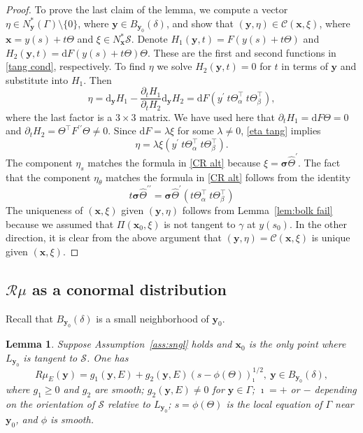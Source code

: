 \documentclass[11pt]{article}
\newcommand{\be}{\begin{equation}}
\newcommand{\ee}{\end{equation}}
\newcommand{\s}{\mathcal S}
\newcommand{\cC}{\mathcal C}
\newcommand{\pa}{\partial}
\newcommand{\bt}{\beta}
\newcommand{\al}{\alpha}
\newcommand{\la}{\lambda}
\newcommand{\dd}{\mathrm{d}}
\newcommand{\ga}{\gamma}
\newcommand{\de}{\delta}
\numberwithin{equation}{section}
\newcommand{\vy}{\mathbf{y}}
\newcommand{\vx}{\mathbf{x}}
\newcommand{\vsig}{{\boldsymbol{\sigma}}}
\newtheorem{lemma}[theorem]{Lemma}
\theoremstyle{definition}
\begin{document}
\begin{proof}
To prove the last claim of the lemma, we compute a vector $\eta\in N_{\vy}^*(\Gamma)\setminus\{0\}$, where $\vy\in B_{\vy_0}(\de)$, and show that $(\vy,\eta)\in\cC(\vx,\xi)$, where $\vx=y(s)+t\Theta$ and $\xi\in N_{\vx}^*\s$. Denote $H_1(\vy,t) = F(y(s)+t\Theta)$ and $H_2(\vy,t) = \dd F(y(s)+t\Theta)\Theta$. These are the first and second functions in \eqref{tang cond}, respectively. To find $\eta$ we solve $H_2(\vy,t)=0$ for $t$ in terms of $\vy$ and substitute into $H_1$. Then
\be\label{eta tang}
\eta=\dd_{\vy}H_1-\frac{\pa_t H_1}{\pa_t H_2}\dd_{\vy} H_2=\dd F(y^\prime\ t\Theta_\al^\top\ t\Theta_\bt^\top),
\ee
where the last factor is a $3\times 3$ matrix. We have used here that $\pa_t H_1=\dd F\Theta=0$
and $\pa_t H_2=\Theta^\top F^{\prime\prime}\Theta\not=0$. Since $\dd F=\la\xi$ for some $\la\neq0$, \eqref{eta tang} implies
\be\label{eta tang v2}
\eta=\la\xi(y^\prime\ t\Theta_\al^\top\ t\Theta_\bt^\top).
\ee
The component $\eta_s$ matches the formula in \eqref{CR alt} because $\xi=\vsig\hat\Theta^\prime$. The fact that the component $\eta_\theta$ matches the formula in \eqref{CR alt} follows from the identity
\be
t\vsig\hat\Theta^{\prime\prime}=\vsig\hat\Theta^\prime(t\Theta_\al^\top\ t\Theta_\bt^\top)
\ee
The uniqueness of $(\vx,\xi)$ given $(\vy,\eta)$ follows from Lemma~\ref{lem:bolk fail} because we assumed that $\Pi(\vx_0,\xi)$ is not tangent to $\ga$ at $y(s_0)$. In the other direction, it is clear from the above argument that $(\vy,\eta)=\cC(\vx,\xi)$ is unique given $(\vx,\xi)$.
\end{proof}


\subsection{$\mathcal{R}\mu$ as a conormal distribution}\label{ssec:conorm}
Recall that $B_{\vy_0}(\delta)$ is a small neighborhood of $\vy_0$.

\begin{lemma}\label{lem:sing-ty} Suppose Assumption~\ref{ass:sngl} holds and $\vx_0$ is the only point where $L_{\vy_0}$ is tangent to $\s$. One has 
\be
\label{dist_R}
R\mu_E(\vy) =  g_1(\vy,E) + g_2(\vy,E)(s - \phi(\Theta))^{1/2}_\imath ,\ \vy\in B_{\vy_0}(\delta),
\ee
where $g_1\geq 0$ and $g_2$ are smooth; $g_2(\vy,E) \neq 0$ for $\vy\in\Gamma$; $\imath = +$ or $-$ depending on the orientation of $\s$ relative to $L_{\vy_0}$; $s = \phi(\Theta)$ is the local equation of $\Gamma$ near $\vy_0$, and $\phi$ is smooth.  
\end{lemma}
\end{document}
